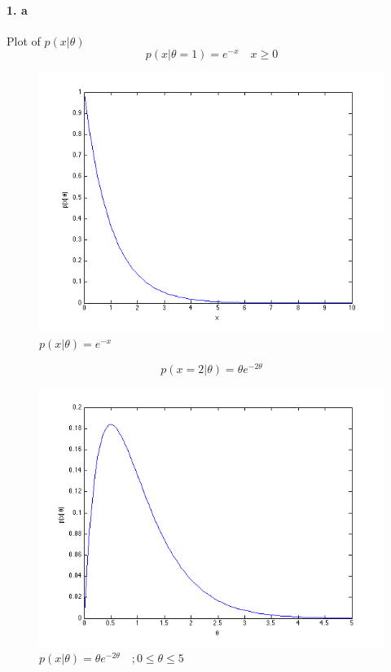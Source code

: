\documentclass[a4paper]{article}
\begin{document}
\paragraph{1. a} Plot of $p(x|\theta)$\\
\begin{equation}
p(x|\theta = 1) = e^{-x} \quad x \geq 0
\end{equation}
\begin{figure}[H]
  \centering
    \includegraphics[scale=.52]{images/1_a_1.png}
  \caption{$p(x|\theta) = e^{-x}$}
\end{figure}

\begin{equation}
p(x = 2|\theta) = \theta e^{-2\theta}
\end{equation}
\begin{figure}[H]
  \centering
    \includegraphics[scale=.52]{images/1_a_2.png}
  \caption{$p(x|\theta) = \theta e^{-2\theta} \quad; 0 \leq \theta \leq 5$}
\end{figure}
\end{document}

